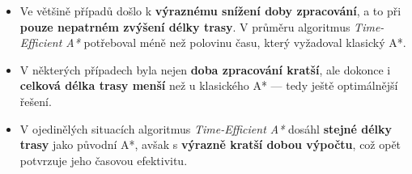 \documentclass[10pt, a4paper]{article}
\begin{document}
\begin{itemize}
    \item Ve většině případů došlo k \textbf{výraznému snížení doby zpracování}, a to při \textbf{pouze nepatrném zvýšení délky trasy}.
    V průměru algoritmus \textit{Time-Efficient A*} potřeboval méně než polovinu času, který vyžadoval klasický A*.

    \item V některých případech byla nejen \textbf{doba zpracování kratší}, ale dokonce i \textbf{celková délka trasy menší} než u klasického A* — tedy ještě optimálnější řešení.

    \item V ojedinělých situacích algoritmus \textit{Time-Efficient A*} dosáhl \textbf{stejné délky trasy} jako původní A*, avšak s \textbf{výrazně kratší dobou výpočtu}, což opět potvrzuje jeho časovou efektivitu.
\end{itemize}

\begin{table}[H]
\centering
\caption{Porovnání výsledků konvenčního a časově efektivního algoritmu A*}
\label{tab:comparison}
\end{table}
\end{document}
